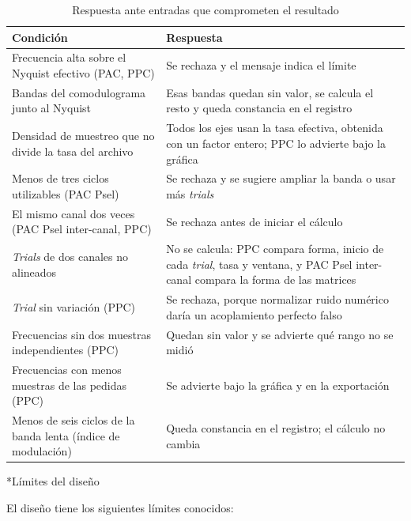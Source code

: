 \documentclass[12pt,letterpaper,oneside]{article}
\makeatletter
\newcommand{\subsubsubsection}[1]{%
  \@startsection{paragraph}{4}{\z@}{10pt plus 2pt minus 1pt}{4pt}%
    {\normalfont\normalsize\bfseries\itshape}*{#1}}
\makeatother
\begin{document}
\begin{table}[!htb]
  \centering
  \small{}
  \renewcommand{\arraystretch}{1.15}
  \begin{tabular}{|>{\raggedright\arraybackslash}p{6.9cm}|>{\raggedright\arraybackslash}p{7.8cm}|}
    \hline
    \textbf{Condición} & \textbf{Respuesta} \\ \hline
    Frecuencia alta sobre el Nyquist efectivo (PAC, PPC) & Se rechaza y el mensaje indica el límite \\ \hline
    Bandas del comodulograma junto al Nyquist & Esas bandas quedan sin valor, se calcula el resto y queda constancia en el registro \\ \hline
    Densidad de muestreo que no divide la tasa del archivo & Todos los ejes usan la tasa efectiva, obtenida con un factor entero; PPC lo advierte bajo la gráfica \\ \hline
    Menos de tres ciclos utilizables (PAC Psel) & Se rechaza y se sugiere ampliar la banda o usar más \textit{trials} \\ \hline
    El mismo canal dos veces (PAC Psel inter-canal, PPC) & Se rechaza antes de iniciar el cálculo \\ \hline
    \textit{Trials} de dos canales no alineados & No se calcula: PPC compara forma, inicio de cada \textit{trial}, tasa y ventana, y PAC Psel inter-canal compara la forma de las matrices \\ \hline
    \textit{Trial} sin variación (PPC) & Se rechaza, porque normalizar ruido numérico daría un acoplamiento perfecto falso \\ \hline
    Frecuencias sin dos muestras independientes (PPC) & Quedan sin valor y se advierte qué rango no se midió \\ \hline
    Frecuencias con menos muestras de las pedidas (PPC) & Se advierte bajo la gráfica y en la exportación \\ \hline
    Menos de seis ciclos de la banda lenta (índice de modulación) & Queda constancia en el registro; el cálculo no cambia \\ \hline
  \end{tabular}
\caption{Respuesta ante entradas que comprometen el resultado}
\label{tab:controles}
\end{table}

\subsubsubsection{Límites del diseño}

El diseño tiene los siguientes límites conocidos:
\end{document}
